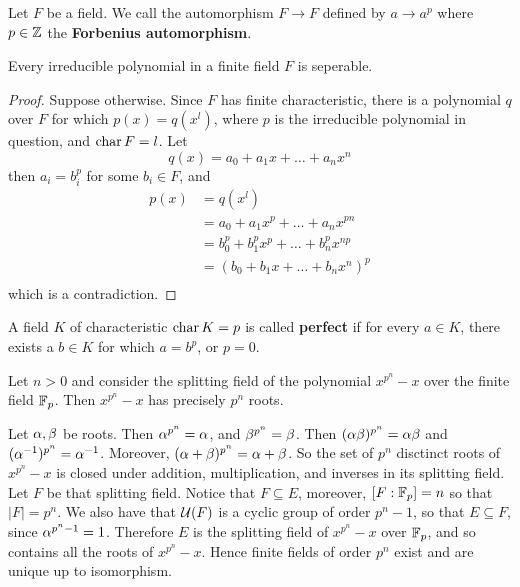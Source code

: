 \begin{definition}
  Let $F$ be a field. We call the automorphism  $F \xrightarrow{} F$ defined
  by $a \xrightarrow{} a^p$ where $p \in \mathbb{Z}$ the \textbf{Forbenius automorphism}.
\end{definition}

\begin{lemma}\label{lemma_8.6.7}
  Every irreducible polynomial in a finite field $F$ is seperable.
\end{lemma}
\begin{proof}
  Suppose otherwise. Since $F$ has finite characteristic, there is a
  polynomial $q$ over $F$ for which $p(x)=q(x^l)$, where $p$ is the
  irreducible polynomial in question, and  $\operatorname{char}{F}=l$. Let
  \begin{equation*}
    q(x)=a_0+a_1x+\dots+a_nx^n
  \end{equation*}
  then $a_i=b_i^p$ for some  $b_i \in F$, and
  \begin{align*}
    p(x)    &=  q(x^l)  \\
            &=  a_0+a_1x^p+\dots+a_nx^{pn}  \\
            &=  b_0^p+b_1^px^p+\dots+b_n^px^{np}    \\
            &=  (b_0+b_1x+\dots+b_nx^n)^p   \\
  \end{align*}
  which is a contradiction.
\end{proof}

\begin{definition}
  A field $K$ of characteristic  $\operatorname{char}{K}=p$ is called \textbf{perfect} if
  for every $a \in K$, there exists a  $b \in K$ for which  $a=b^p$, or
  $p=0$.
\end{definition}

\begin{example}\label{example_8.16}
  Let $n>0$ and consider the splitting field of the polynomial  $x^{p^n}-x$
  over the finite field  $\mathbb{F}_p$. Then  $x^{p^n}-x$ has precisely $p^n$ roots.

  Let $\alpha,\beta$ be roots. Then  $\alpha^{p^n}=\alpha$, and $\beta^{p^n}=\beta$. Then
  $(\alpha\beta)^{p^n}=\alpha\beta$ and $(\alpha^{-1})^{p^n}=\alpha^{-1}$. Moreover,
  $(\alpha+\beta)^{p^n}=\alpha+\beta$. So the set of $p^n$ disctinct roots of  $x^{p^n}-x$
  is closed under addition, multiplication, and inverses in its splitting
  field. Let $F$ be that splitting field. Notice that  $F \subseteq E$,
  moreover, $[F:\mathbb{F}_p]=n$ so that $|F|=p^n$. We also have that
  $\mathcal{U}(F)$ is a cyclic group of order $p^n-1$, so that $E \subseteq F$,
  since $\alpha^{p^n-1}=1$. Therefore $E$ is the splitting field of
  $x^{p^n}-x$ over $\mathbb{F}_p$, and so contains all the roots of $x^{p^n}-x$. Hence
  finite fields of order $p^n$ exist and are unique up to isomorphism.
\end{example}


